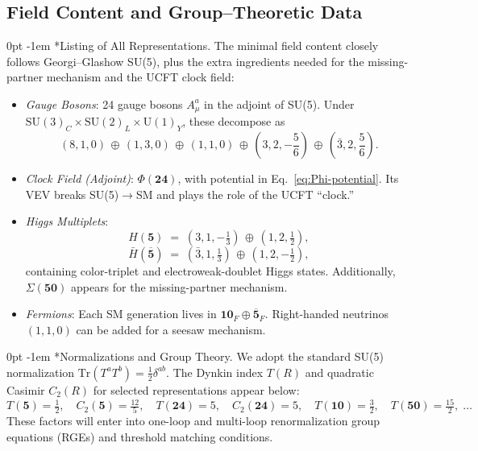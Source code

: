 \documentclass[aps,prd,preprint,groupedaddress]{revtex4-2}
\makeatletter
\renewcommand{\paragraph}[1]{%
  \@startsection{paragraph}{4}{\z@}%
    {0pt}%
    {-1em}%
    {\normalfont\normalsize\itshape}*{#1}}
\makeatother
\begin{document}
\subsection{Field Content and Group--Theoretic Data}
\label{subsec:field-content}

\paragraph{Listing of All Representations.}
The minimal field content closely follows Georgi--Glashow SU(5), plus the extra ingredients needed for the missing-partner mechanism and the UCFT clock field:
\begin{itemize}
    \item \emph{Gauge Bosons}: 24 gauge bosons \(A_\mu^a\) in the adjoint of SU(5). Under 
    \(\mathrm{SU}(3)_C \times \mathrm{SU}(2)_L \times \mathrm{U}(1)_Y\),
    these decompose as
    \[
    (8,1,0)\,\oplus\,(1,3,0)\,\oplus\,(1,1,0)\,\oplus\,\left(3,2,-\frac{5}{6}\right)\,\oplus\,\left(\bar{3},2,\frac{5}{6}\right).
    \]

    \item \emph{Clock Field (Adjoint)}: \(\Phi(\mathbf{24})\), with potential in Eq.~\eqref{eq:Phi-potential}.  Its VEV breaks SU(5)\(\to\)SM and plays the role of the UCFT “clock.”

    \item \emph{Higgs Multiplets}:
    \[
    H(\mathbf{5}) \;=\;
    (3,1,-\tfrac{1}{3})\,\oplus\,(1,2,\tfrac12),
    \]
    \[
    \bar{H}(\mathbf{\overline{5}}) \;=\;
    (\bar{3},1,\tfrac{1}{3})\,\oplus\,(1,2,-\tfrac12),
    \]
    containing color-triplet and electroweak-doublet Higgs states.  
    Additionally, \(\Sigma(\mathbf{50})\) appears for the missing-partner mechanism.

    \item \emph{Fermions}: Each SM generation lives in
    \(\mathbf{10}_F\oplus\mathbf{\overline{5}}_F\).  Right-handed neutrinos \((1,1,0)\) can be added for a seesaw mechanism. 
\end{itemize}

\paragraph{Normalizations and Group Theory.}
We adopt the standard SU(5) normalization \(\mathrm{Tr}(T^a T^b) = \tfrac12 \delta^{ab}\).  
The Dynkin index \(T(R)\) and quadratic Casimir \(C_2(R)\) for selected representations appear below:
\[
T(\mathbf{5}) = \tfrac12, 
\quad
C_2(\mathbf{5}) = \tfrac{12}{5},
\quad
T(\mathbf{24}) = 5,
\quad
C_2(\mathbf{24}) = 5,
\quad
T(\mathbf{10}) = \tfrac32,
\quad
T(\mathbf{50}) = \tfrac{15}{2}, 
\;\dots
\]
These factors will enter into one-loop and multi-loop renormalization group equations (RGEs) and threshold matching conditions.
\end{document}
